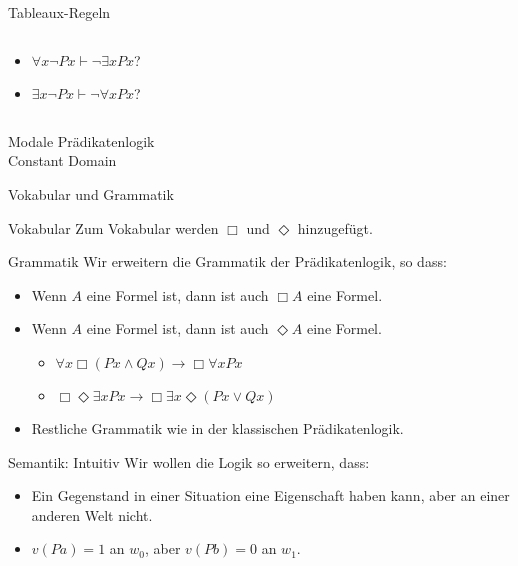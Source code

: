 \documentclass[12pt]{beamer}
\begin{document}
\begin{frame}{Tableaux-Regeln}
\begin{columns}
  \begin{column}[t]{.5 \linewidth}
    \begin{itemize}[<+->]
    \item $\forall x \neg Px \vdash \neg \exists x Px$?
    \item $\exists x \neg Px \vdash \neg \forall x Px$?
    \end{itemize}

  \end{column}
\end{columns}

\end{frame}

\begin{frame}
  \Huge Modale Prädikatenlogik\\
  \large Constant Domain
\end{frame}

\begin{frame}{Vokabular und Grammatik}
  \begin{block}{Vokabular}
    Zum Vokabular werden $\Box$ und $\Diamond$ hinzugefügt.
  \end{block}

  \pause
  \begin{block}{Grammatik}
    Wir erweitern die Grammatik der Prädikatenlogik, so dass: \pause
    \begin{itemize}[<+->]
    \item Wenn $A$ eine Formel ist, dann ist auch $\Box A$ eine
      Formel.
    \item Wenn $A$ eine Formel ist, dann ist auch $\Diamond A$ eine
      Formel.
      \begin{itemize}
      \item $\forall x \Box (Px \land Qx) \to \Box \forall x Px$
      \item
        $\Box \Diamond \exists x Px \to \Box \exists x \Diamond (Px
        \lor Qx)$
      \end{itemize}
    \item Restliche Grammatik wie in der klassischen Prädikatenlogik.
    \end{itemize}
  \end{block}

\end{frame}

\begin{frame}{Semantik: Intuitiv}
  Wir wollen die Logik so erweitern, dass: \pause
  \begin{itemize}[<+->]
  \item Ein Gegenstand in einer Situation eine Eigenschaft haben kann,
    aber an einer anderen Welt nicht.
  \item $v(Pa) = 1$ an $w_0$, aber $v(Pb) = 0$ an $w_1$.
  \end{itemize}
\end{frame}
\end{document}
